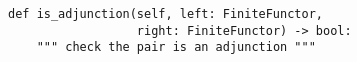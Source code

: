 \begin{verbatim}
def is_adjunction(self, left: FiniteFunctor,
                  right: FiniteFunctor) -> bool:
    """ check the pair is an adjunction """
\end{verbatim}